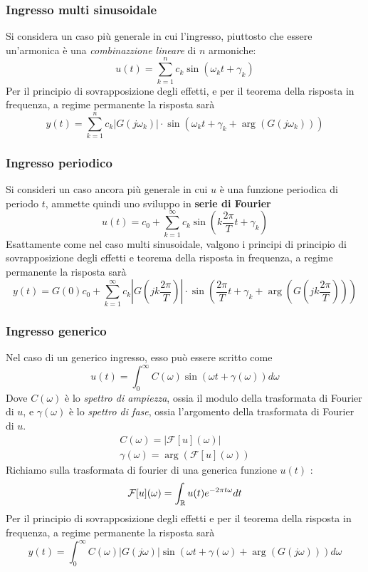 \documentclass[10pt, letterpaper]{report}
\begin{document}
\subsubsection{Ingresso multi sinusoidale}
Si considera un caso più generale in cui l'ingresso, piuttosto che essere un'armonica è una \textit{combinazzione lineare} di $n$ armoniche:
$$ u(t)=\sum_{k=1}^nc_k\sin(\omega_kt+\gamma_k)$$
Per il principio di sovrapposizione degli effetti, e per il teorema della risposta in frequenza, a regime permanente la risposta sarà 
$$ y(t)=\sum_{k=1}^nc_k|G(j\omega_k)|\cdot \sin(\omega_kt+\gamma_k+\arg(G(j\omega_k)))$$
\subsubsection{Ingresso periodico}
Si consideri un caso ancora più generale in cui $u$ è una funzione periodica di periodo $t$, ammette quindi uno sviluppo in \textbf{serie di Fourier} 
$$ u(t)=c_0+\sum_{k=1}^{\infty}c_k\sin(k\frac{2\pi}{T}t+\gamma_k)$$
Esattamente come nel caso multi sinusoidale, valgono i principi di principio di sovrapposizione degli effetti e teorema della risposta in frequenza, a regime permanente la risposta sarà  
$$ y(t)=G(0)c_0+\sum_{k=1}^{\infty}c_k|G(jk\frac{2\pi}{T})|\cdot \sin(\frac{2\pi}{T}t+\gamma_k+\arg(G(jk\frac{2\pi}{T})))$$
\subsubsection{Ingresso generico}
Nel caso di un generico ingresso, esso può essere scritto come 
$$ u(t)=\int_0^\infty C(\omega)\sin(\omega t+\gamma(\omega))d\omega$$
Dove $C(\omega)$ è lo \textit{spettro di ampiezza}, ossia il modulo della trasformata di Fourier di $u$, e $\gamma(\omega)$ è lo \textit{spettro di fase}, ossia l'argomento della trasformata di Fourier di $u$.
$$ \begin{matrix}
    C(\omega)=|\mathcal{F}[u](\omega)| \\ 
    \gamma(\omega)=\arg(\mathcal{F}[u](\omega))
\end{matrix}$$
Richiamo sulla trasformata di fourier di una generica funzione $u(t)$ : 
$$\mathcal{F}[u](\omega)=\int_{{\mathbb R}}u(t)e^{-2\pi t \omega }dt $$
Per il principio di sovrapposizione degli effetti e per il teorema della risposta in frequenza,  a regime permanente la risposta sarà  
 $$
 y(t)=\int_0^\infty C(\omega)|G(j\omega)|\sin(\omega t+\gamma(\omega)+\arg(G(j\omega )))d\omega
 $$
\end{document}
